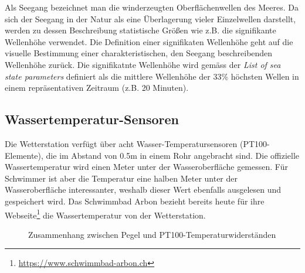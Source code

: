Als Seegang bezeichnet man die winderzeugten Oberflächenwellen des Meeres. Da sich der Seegang in der Natur als eine Überlagerung vieler Einzelwellen darstellt, werden zu dessen Beschreibung statistische Größen wie z.B. die signifikante Wellenhöhe verwendet. Die Definition einer signifikaten Wellenhöhe geht auf die visuelle Bestimmung einer charakteristischen, den Seegang beschreibenden Wellenhöhe zurück. Die signifikatnte Wellenhöhe wird gemäss der \textit{List of sea state parameters}\cite{1986Iahr} definiert als die mittlere Wellenhöhe der 33\% höchsten Wellen in einem repräsentativen Zeitraum (z.B. 20 Minuten).


\subsection{Wassertemperatur-Sensoren}
Die Wetterstation verfügt über acht Wasser-Temperatursensoren (PT100-Elemente), die im Abstand von 0.5m in einem Rohr angebracht sind. Die offizielle Wassertemperatur wird einen Meter unter der Wasseroberfläche gemessen. Für Schwimmer ist aber die Temperatur eine halben Meter unter der Wasseroberfläche interessanter, weshalb dieser Wert ebenfalls ausgelesen und gespeichert wird. Das Schwimmbad Arbon bezieht bereits heute für ihre Webseite\footnote{\url{https://www.schwimmbad-arbon.ch}} die Wassertemperatur von der Wetterstation.

\begin{figure}[htbp]
	\centering
	\caption{Zusammenhang zwischen Pegel und PT100-Temperaturwiderständen}
	\label{img:wassertempsensoren}
\end{figure}

